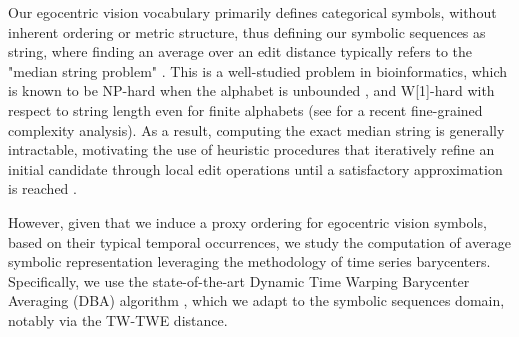 \begin{chapterabstract}
    Our egocentric vision vocabulary primarily defines categorical symbols, without inherent ordering or metric structure, thus defining our symbolic sequences as string, where finding an average over an edit distance typically refers to the "median string problem" \cite{KOHONEN1985309}. This is a well-studied problem in bioinformatics, which is known to be NP-hard when the alphabet is unbounded \cite{DELAHIGUERA200039}, and W[1]-hard with respect to string length even for finite alphabets \cite{NICOLAS2005390} (see \cite{fine_grained_complexity} for a recent fine-grained complexity analysis). As a result, computing the exact median string is generally intractable, motivating the use of heuristic procedures that iteratively refine an initial candidate through local edit operations until a satisfactory approximation is reached \cite{Mirabal2019PivotSF}.
    
    However, given that we induce a proxy ordering for egocentric vision symbols, based on their typical temporal occurrences, we study the computation of average symbolic representation leveraging the methodology of time series barycenters. Specifically, we use the state-of-the-art Dynamic Time Warping Barycenter Averaging (DBA) algorithm \cite{PETITJEAN2011678}, which we adapt to the symbolic sequences domain, notably via the TW-TWE distance.




    

    
    


\end{chapterabstract}
